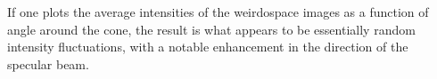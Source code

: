 If one plots the average intensities of the weirdospace images as a
function of angle around the cone, the result is what appears to be
essentially random intensity fluctuations, with a notable enhancement in
the direction of the specular beam.
